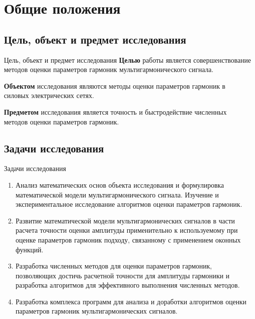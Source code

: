 \captionsetup[figure]{labelformat=simple, labelsep=period}
\section{Общие положения}

\subsection{Цель, объект и предмет исследования}
\begin{frame}{Цель, объект и предмет исследования}
	\textbf{Целью} работы является совершенствование методов оценки параметров гармоник мультигармонического сигнала. \vspace{1em}

	\textbf{Объектом} исследования являются методы оценки параметров гармоник в силовых электрических сетях. \vspace{1em}
	
	\textbf{Предметом} исследования является точность и быстродействие численных методов оценки параметров гармоник.	
\end{frame}

\subsection{Задачи исследования}
\begin{frame}{Задачи исследования}
	\begin{enumerate}
		\item Анализ математических основ объекта исследования и формулировка математической модели мультигармонического сигнала. Изучение и экспериментальное исследование алгоритмов оценки параметров гармоник.
		\item Развитие математической модели мультигармонических сигналов в части расчета точности оценки амплитуды применительно к используемому при оценке параметров гармоник подходу, связанному с применением оконных функций.
		\item Разработка численных методов для оценки параметров гармоник, позволяющих достичь расчетной точности для амплитуды гармоники и разработка алгоритмов для эффективного выполнения численных методов.
		\item Разработка комплекса программ для анализа и доработки алгоритмов оценки параметров гармоник мультигармонических сигналов.
	\end{enumerate}
\end{frame}

